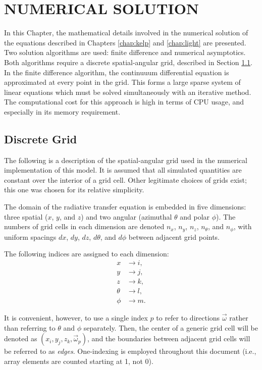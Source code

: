 \chapter{NUMERICAL SOLUTION}
\label{chap:numerical}
In this Chapter, the mathematical details involved in the numerical solution of the equations described in Chapters \ref{chap:kelp} and \ref{chap:light} are presented.
Two solution algorithms are used: finite difference and numerical asymptotics.
Both algorithms require a discrete spatial-angular grid, described in Section \ref{sec:grid}.
In the finite difference algorithm, the continuuum differential equation is approximated at every point in the grid.
This forms a large sparse system of linear equations which must be solved simultaneously with an iterative method.
The computational cost for this approach is high in terms of CPU usage, and especially in its memory requirement.

\section{Discrete Grid}
\label{sec:grid}

The following is a description of the spatial-angular grid used in the numerical implementation of this model.
It is assumed that all simulated quantities are constant over the interior of a grid cell.
Other legitimate choices of grids exist; this one was chosen for its relative simplicity.

The domain of the radiative transfer equation is embedded in five dimensions: three spatial ($x$, $y$, and $z$) and two angular (azimuthal $\theta$ and polar $\phi$).
The numbers of grid cells in each dimension are denoted $n_x$, $n_y$, $n_z$,
$n_\theta$, and $n_\phi$, with uniform spacings $dx$, $dy$, $dz$, $d\theta$, and
$d\phi$ between adjacent grid points.

The following indices are assigned to each dimension:
\begin{align*}
  x &\to i, \\
  y &\to j, \\
  z &\to k, \\
  \theta &\to l, \\
  \phi &\to m.
\end{align*}

It is convenient, however, to use a single index $p$ to refer to directions $\vec{\omega}$ rather than referring to $\theta$ and $\phi$ separately.
Then, the center of a generic grid cell will be denoted as
$(x_i, y_j, z_k, \vec{\omega}_p)$, and the boundaries between adjacent grid cells
will be referred to as \textit{edges}.
One-indexing is employed throughout this document (i.e., array elements are counted starting at 1, not 0).

